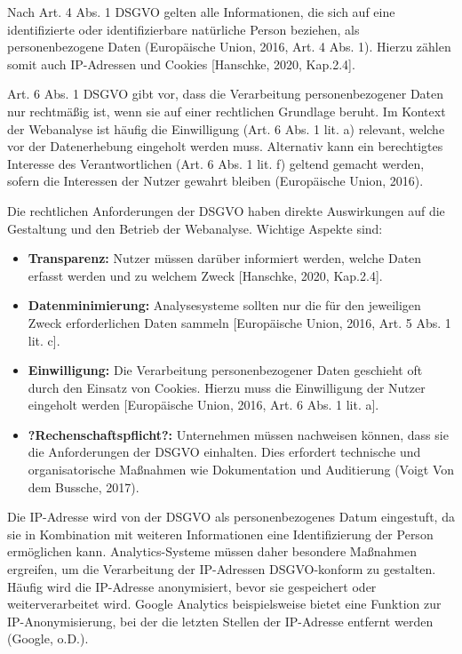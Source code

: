 Nach Art. 4 Abs. 1 DSGVO gelten alle Informationen, die sich auf eine identifizierte oder identifizierbare natürliche Person beziehen, als personenbezogene Daten (Europäische Union, 2016, Art. 4 Abs. 1). Hierzu zählen somit auch IP-Adressen und Cookies [Hanschke, 2020, Kap.2.4].

Art. 6 Abs. 1 DSGVO gibt vor, dass die Verarbeitung personenbezogener Daten nur rechtmäßig ist, wenn sie auf einer rechtlichen Grundlage beruht. Im Kontext der Webanalyse ist häufig die Einwilligung (Art. 6 Abs. 1 lit. a) relevant, welche vor der Datenerhebung eingeholt werden muss. Alternativ kann ein berechtigtes Interesse des Verantwortlichen (Art. 6 Abs. 1 lit. f) geltend gemacht werden, sofern die Interessen der Nutzer gewahrt bleiben (Europäische Union, 2016).

Die rechtlichen Anforderungen der DSGVO haben direkte Auswirkungen auf die Gestaltung und den Betrieb der Webanalyse. Wichtige Aspekte sind:

\begin{itemize}
    \item \textbf{Transparenz:} Nutzer müssen darüber informiert werden, welche Daten erfasst werden und zu welchem Zweck [Hanschke, 2020, Kap.2.4].
    \item \textbf{Datenminimierung:} Analysesysteme sollten nur die für den jeweiligen Zweck erforderlichen Daten sammeln [Europäische Union, 2016, Art. 5 Abs. 1 lit. c].
    \item \textbf{Einwilligung:} Die Verarbeitung personenbezogener Daten geschieht oft durch den Einsatz von Cookies. Hierzu muss die Einwilligung der Nutzer eingeholt werden [Europäische Union, 2016, Art. 6 Abs. 1 lit. a]. 
    \item \textbf{?Rechenschaftspflicht?:} Unternehmen müssen nachweisen können, dass sie die Anforderungen der DSGVO einhalten. Dies erfordert technische und organisatorische Maßnahmen wie Dokumentation und Auditierung (Voigt Von dem Bussche, 2017).
\end{itemize}

Die IP-Adresse wird von der DSGVO als personenbezogenes Datum eingestuft, da sie in Kombination mit weiteren Informationen eine Identifizierung der Person ermöglichen kann. Analytics-Systeme müssen daher besondere Maßnahmen ergreifen, um die Verarbeitung der IP-Adressen DSGVO-konform zu gestalten. Häufig wird die IP-Adresse anonymisiert, bevor sie gespeichert oder weiterverarbeitet wird. Google Analytics beispielsweise bietet eine Funktion zur IP-Anonymisierung, bei der die letzten Stellen der IP-Adresse entfernt werden (Google, o.D.). %

